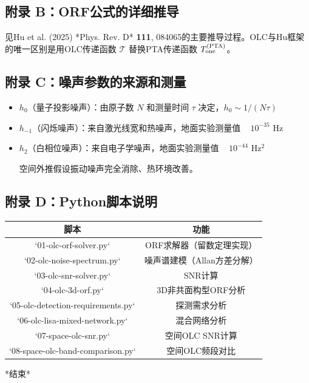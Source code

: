 \documentclass[12pt,a4paper]{article}
\begin{document}
\subsection{附录 B：ORF公式的详细推导}


见Hu et al. (2025) *Phys. Rev. D* \textbf{111}, 084065的主要推导过程。OLC与Hu框架的唯一区别是用OLC传递函数 $\mathcal{T}$ 替换PTA传递函数 $T_{\rm one}^{\rm (PTA)}$。

\subsection{附录 C：噪声参数的来源和测量}


\begin{itemize}
  \item $h_0$（量子投影噪声）：由原子数 $N$ 和测量时间 $\tau$ 决定，$h_0 \sim 1/(N\tau)$
  \item $h_{-1}$（闪烁噪声）：来自激光线宽和热噪声，地面实验测量值 ~ $10^{-35}$ Hz
  \item $h_2$（白相位噪声）：来自电子学噪声，地面实验测量值 ~ $10^{-44}$ Hz$^2$

空间外推假设振动噪声完全消除、热环境改善。

\end{itemize}
\subsection{附录 D：Python脚本说明}


\begin{tabular}{|c|c|}
\hline
脚本 & 功能 \\
\hline
`01-olc-orf-solver.py` & ORF求解器（留数定理实现） \\
`02-olc-noise-spectrum.py` & 噪声谱建模（Allan方差分解） \\
`03-olc-snr-solver.py` & SNR计算 \\
`04-olc-3d-orf.py` & 3D非共面构型ORF分析 \\
`05-olc-detection-requirements.py` & 探测需求分析 \\
`06-olc-lisa-mixed-network.py` & 混合网络分析 \\
`07-space-olc-snr.py` & 空间OLC SNR计算 \\
`08-space-olc-band-comparison.py` & 空间OLC频段对比 \\
\hline
\end{tabular}



*结束*
\end{document}
